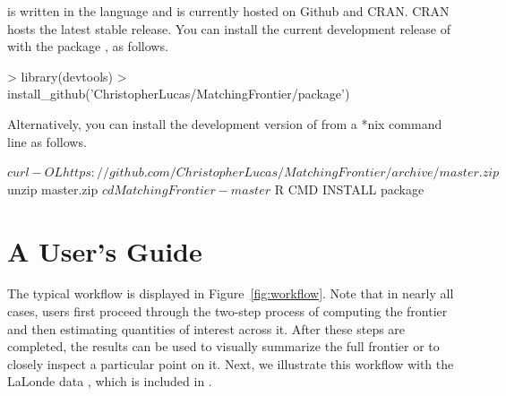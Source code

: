 \documentclass[nojss]{jss}
\begin{document}
 is written in the  language
\citep{r2012} and is currently hosted on Github and CRAN. CRAN hosts
the latest stable release. You can install the current development
release of  with the  package
\citep{wickham2013}, as follows.

\begin{Schunk}
\begin{Sinput}
> library(devtools) 
> install_github('ChristopherLucas/MatchingFrontier/package')
\end{Sinput}
\end{Schunk}

Alternatively, you can install the development version of
 from a *nix command line as follows.

\begin{Schunk}
\begin{Soutput}
 $ curl -OL https://github.com/ChristopherLucas/MatchingFrontier/archive/master.zip
 $ unzip master.zip
 $ cd MatchingFrontier-master
 $ R CMD INSTALL package
\end{Soutput}
\end{Schunk}

\section[A User's Guide]{A User's Guide}

The typical  workflow is displayed in
Figure~\ref{fig:workflow}. Note that in nearly all cases, users first
proceed through the two-step process of computing the frontier and
then estimating quantities of interest across it. After these steps
are completed, the results can be used to visually summarize the full
frontier or to closely inspect a particular point on it.  Next, we
illustrate this workflow with the LaLonde data
\citep{lalonde1986,dehejia1999}, which is included in
.
\end{document}
